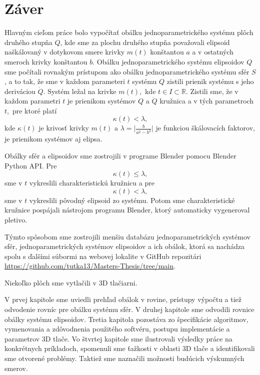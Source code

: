 \chapter*{Záver}
Hlavným cieľom práce bolo vypočítať obálku jednoparametrického systému plôch druhého stupňa $Q$, kde sme za plochu druhého stupňa považovali elipsoid naškálovaný v dotykovom smere krivky $m(t)$ konštantou $a$ a v ostatných smeroch krivky konštantou $b$. Obálku jednoparametrického systému elipsoidov $Q$ sme počítali rovnakým prístupom ako obálku jednoparametrického systému sfér $S$, a to tak, že sme v každom parameteri $t$ systému $Q$ zistili prienik systému s jeho deriváciou $\dot{Q}$. Systém ležal na krivke $m(t),$ kde $t \in I \subset \mathbb{R}.$
Zistili sme, že v každom parametri $t$ je prienikom systémov $Q$ a $\dot{Q}$ kružnica a v tých parametroch $t,$ pre ktoré platí
$$
\kappa(t) < \lambda,
$$  
kde $\kappa(t)$ je krivosť krivky $m(t)$ a $\lambda = \big| \frac{b}{a^2 - b^2} \big| $ je funkciou škálovacích faktorov, je prienikom systémov aj elipsa.

Obálky sfér a elipsoidov sme zostrojili v programe Blender pomocu Blender Python API. Pre 
$$
\kappa(t) \leq \lambda,
$$  
sme v $t$ vykreslili charakteristickú kružnicu a pre
$$
\kappa(t) < \lambda,
$$  
sme v $t$ vykreslili pôvodný elipsoid zo systému.
Potom sme charakteristické kružnice pospájali nástrojom programu Blender, ktorý automaticky vygeneroval pletivo. 

Týmto spôsobom sme zostrojili menšiu databázu jednoparametrických systémov sfér, jednoparametrických systémov elipsoidov a ich obálok, ktorá sa nachádza spolu s ďalšími súbormi na webovej lokalite v GitHub repozitári \url{https://github.com/tutka13/Masters-Thesis/tree/main}. 

Niekoľko plôch sme vytlačili v 3D tlačiarni.

V prvej kapitole sme uviedli prehľad obálok v rovine, prístupy výpočtu a tiež odvodenie rovníc pre obálku systému sfér. V druhej kapitole sme odvodili rovnice obálky systému elipsoidov. Tretia kapitola pozostáva zo špecifikácie algoritmov, vymenovania a zdôvodnenia použitého softvéru, postupu implementácie a parametrov 3D tlače. Vo štvrtej kapitole sme ilustrovali výsledky práce na konkrétnych príkladoch, spomenuli sme ťažkosti v oblasti 3D tlače a identifikovali sme otvorené problémy. Taktiež sme naznačili možnosti budúcich výskumných smerov.